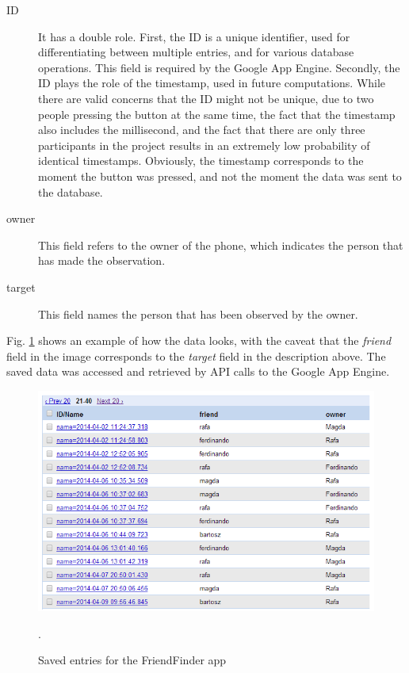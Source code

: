 \begin{description}
  \item[ID] It has a double role. First, the ID is a unique identifier, used for differentiating between multiple entries, and for various database operations. This field is required by the Google App Engine. Secondly, the ID plays the role of the timestamp, used in future computations. While there are valid concerns that the ID might not be unique, due to two people pressing the button at the same time, the fact that the timestamp also includes the millisecond, and the fact that there are only three participants in the project results in an extremely low probability of identical timestamps. Obviously, the timestamp corresponds to the moment the button was pressed, and not the moment the data was sent to the database.  
  \item[owner] This field refers to the owner of the phone, which indicates the person that has made the observation.
  \item[target] This field names the person that has been observed by the owner.
\end{description}

Fig. \ref{pic:dataviewer} shows an example of how the data looks, with the caveat that the \textit{friend} field in the image corresponds to the \textit{target} field in the description above. The saved data was accessed and retrieved by API calls to the Google App Engine.  

\begin{figure}[h]
	\begin{center}
		\includegraphics[scale=0.8]{figures/datastore.png}
	\end{center}
	
	\caption{Saved entries for the FriendFinder app}.
	\label{pic:dataviewer}

\end{figure}


